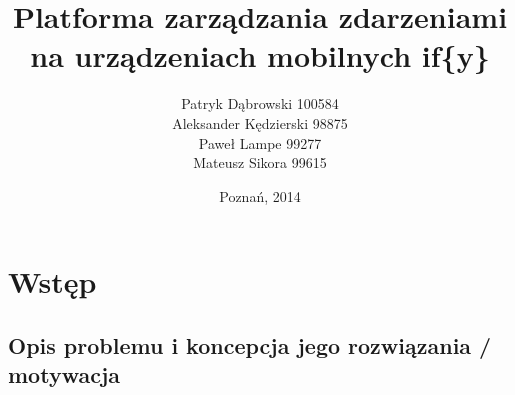 \documentclass[11pt,a4paper,polish,thesis]{dcsbook}
\begin{document}
\author{Patryk Dąbrowski 100584\\ Aleksander Kędzierski 98875\\ Paweł Lampe 99277\\ Mateusz Sikora 99615}
\title{Platforma zarządzania zdarzeniami na urządzeniach mobilnych if\{y\}}
\date{Poznań, 2014}

\maketitle

\frontmatter

\tableofcontents{}

\mainmatter

\chapter{Wstęp}
\section{Opis problemu i koncepcja jego rozwiązania / motywacja} %


\end{document}

